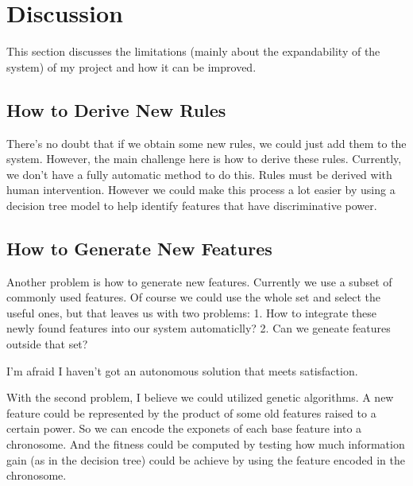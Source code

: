 \section{Discussion}

This section discusses the limitations (mainly about the expandability of the system) of my project and how it can be improved.

\subsection{How to Derive New Rules}

There's no doubt that if we obtain some new rules, we could just add them to the system. However, the main challenge here is how to derive these rules. Currently, we don't have a fully automatic method to do this. Rules must be derived with human intervention. However we could make this process a lot easier by using a decision tree model to help identify features that have discriminative power. 

\subsection{How to Generate New Features}

Another problem is how to generate new features. Currently we use a subset of commonly used features. Of course we could use the whole set and select the useful ones, but that leaves us with two problems: 1. How to integrate these newly found features into our system automaticlly? 2. Can 
we geneate features outside that set?

I'm afraid I haven't got an autonomous solution that meets satisfaction.

With the second problem, I believe we could utilized genetic algorithms. A new feature could be represented by the product of some old features raised to a certain power. So we can encode the exponets of each base feature into a chronosome. And the fitness could be computed by testing how much information gain (as in the decision tree) could be achieve by using the feature encoded in the chronosome.

